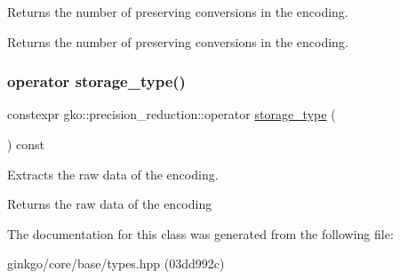 Returns the number of preserving conversions in the encoding. 

\begin{DoxyReturn}{Returns}
the number of preserving conversions in the encoding. 
\end{DoxyReturn}
\mbox{\label{classgko_1_1precision__reduction_a3ee4da03be089565f7ab91b553d7738f}} 
\subsubsection{\texorpdfstring{operator storage\+\_\+type()}{operator storage\_type()}}
{\footnotesize\ttfamily constexpr gko\+::precision\+\_\+reduction\+::operator \hyperlink{classgko_1_1precision__reduction_a2a1a94a27fa69b4cc321136b56e7b7d9}{storage\+\_\+type} (\begin{DoxyParamCaption}{ }\end{DoxyParamCaption}) const\hspace{0.3cm}{\ttfamily [noexcept]}}



Extracts the raw data of the encoding. 

\begin{DoxyReturn}{Returns}
the raw data of the encoding 
\end{DoxyReturn}


The documentation for this class was generated from the following file\+:\begin{DoxyCompactItemize}
\item 
ginkgo/core/base/types.\+hpp (03dd992c)\end{DoxyCompactItemize}
